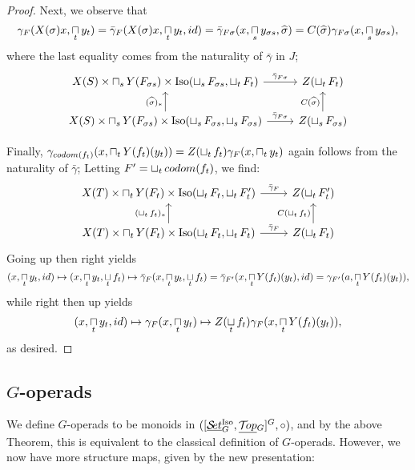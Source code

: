 \documentclass{report}
\newcommand{\Top}{\text{$\mathcal{T}\!op$}}
\newcommand{\Set}{\text{$\mathcal{S}\!et$}}
\DeclareMathOperator{\Iso}{Iso}
\newcommand{\TopG}{\text{\underline{$\Top$}$_G$}}
\newcommand{\SetG}{\text{\underline{$\Set$}$_G^{\mbox{\scriptsize Iso}}$}}
\renewcommand{\ST}{\text{$[\SetG,\TopG]^G$}}
\newcommand{\icap}{\operatornamewithlimits{\sqcap}}
\newcommand{\ico}{\operatornamewithlimits{\sqcup}}
\renewcommand{\hat}[1]{\text{$\widehat{#1}$}}
\begin{document}
\begin{proof}
Next, we observe that
\[\gamma_F(X(\sigma)x,\icap_ty_t) = \bar\gamma_F(X(\sigma)x,\icap_ty_t,id) = \bar\gamma_{F\sigma}(x,\icap_sy_{\sigma s},\hat \sigma) = C(\hat \sigma)\gamma_{F\sigma}(x,\icap_sy_{\sigma s}),\]
where the last equality comes from the naturality of $\bar\gamma$ in $J$;
\[\begin{tikzcd}
  X(S)\times\icap_sY(F_{\sigma s})\times \Iso(\ico_sF_{\sigma s}, \ico_tF_t) \arrow{r}{\bar\gamma_{F\sigma}} & Z(\ico_tF_t) \\
  X(S)\times\icap_sY(F_{\sigma s})\times \Iso(\ico_sF_{\sigma s}, \ico_sF_{\sigma s}) \arrow{u}{(\hat \sigma)_*} \arrow{r}{\bar\gamma_{F\sigma}} & Z(\ico_sF_{\sigma s}) \arrow{u}{C(\hat\sigma)}
\end{tikzcd}\]

Finally, $\gamma_{codom(f_t)}(x,\icap_tY(f_t)(y_t)) = Z(\ico_tf_t)\gamma_F(x,\icap_ty_t)$ again follows from the naturality of $\bar\gamma$; Letting $F' = \ico_tcodom(f_t)$, we find:
\[\begin{tikzcd}
  X(T)\times\icap_tY(F_{t})\times \Iso(\ico_tF_{t}, \ico_tF'_t) \arrow{r}{\bar\gamma_{F}} & Z(\ico_tF'_t) \\
  X(T)\times\icap_tY(F_{t})\times \Iso(\ico_tF_{t}, \ico_tF_{t}) \arrow{u}{(\ico_tf_t)_*} \arrow{r}{\bar\gamma_{F}} & Z(\ico_tF_{t}) \arrow{u}{C(\ico_tf_t)}
\end{tikzcd}\]
Going up then right yields 
\[ (x,\icap_ty_t,id) \mapsto (x,\icap_ty_t,\ico_tf_t) \mapsto \bar\gamma_F(x,\icap_ty_t,\ico_tf_t) = \bar\gamma_{F'}(x,\icap_tY(f_t)(y_t),id) = \gamma_{F'}(a,\icap_tY(f_t)(y_t)),\]
while right then up yields
\[(x,\icap_ty_t,id) \mapsto \gamma_F(x,\icap_ty_t) \mapsto Z(\ico_tf_t)\gamma_{F}(x,\icap_tY(f_t)(y_t)),\]
as desired.
\end{proof}

\subsection{$G$-operads}
We define $G$-operads to be monoids in $(\ST,\circ)$, and by the above Theorem, this is equivalent to the classical definition of $G$-operads. However, we now have more structure maps, given by the new presentation:
\end{document}
